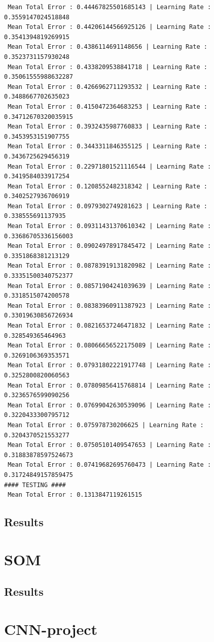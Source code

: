 \documentclass[]{report}
\begin{document}
\begin{verbatim}
 Mean Total Error : 0.44467825501685143 | Learning Rate : 0.3559147024518848
 Mean Total Error : 0.44206144566925126 | Learning Rate : 0.3541394819269915
 Mean Total Error : 0.4386114691148656 | Learning Rate : 0.3523731157930248
 Mean Total Error : 0.4338209538841718 | Learning Rate : 0.35061555988632287
 Mean Total Error : 0.4266962711293532 | Learning Rate : 0.3488667702635023
 Mean Total Error : 0.4150472364683253 | Learning Rate : 0.34712670320035915
 Mean Total Error : 0.3932435987760833 | Learning Rate : 0.3453953151907755
 Mean Total Error : 0.3443311846355125 | Learning Rate : 0.3436725629456319
 Mean Total Error : 0.22971801521116544 | Learning Rate : 0.3419584033917254
 Mean Total Error : 0.1208552482318342 | Learning Rate : 0.3402527936706919
 Mean Total Error : 0.0979302749281623 | Learning Rate : 0.338555691137935
 Mean Total Error : 0.09311431370610342 | Learning Rate : 0.33686705336156003
 Mean Total Error : 0.09024978917845472 | Learning Rate : 0.3351868381213129
 Mean Total Error : 0.08783919131820982 | Learning Rate : 0.33351500340752377
 Mean Total Error : 0.08571904241039639 | Learning Rate : 0.3318515074200578
 Mean Total Error : 0.08383960911387923 | Learning Rate : 0.33019630856726934
 Mean Total Error : 0.08216537246471832 | Learning Rate : 0.328549365464963
 Mean Total Error : 0.08066656522175089 | Learning Rate : 0.3269106369353571
 Mean Total Error : 0.07931802221917748 | Learning Rate : 0.3252800820060563
 Mean Total Error : 0.07809856415768814 | Learning Rate : 0.3236576599090256
 Mean Total Error : 0.07699042630539096 | Learning Rate : 0.3220433300795712
 Mean Total Error : 0.075978730206625 | Learning Rate : 0.3204370521553277
 Mean Total Error : 0.07505101409547653 | Learning Rate : 0.31883878597524673
 Mean Total Error : 0.07419682695760473 | Learning Rate : 0.31724849157859475
#### TESTING ####
 Mean Total Error : 0.1313847119261515
\end{verbatim}
\subsection{Results}
\section{SOM}
\subsection{Results}
\section{CNN-project}
\end{document}
